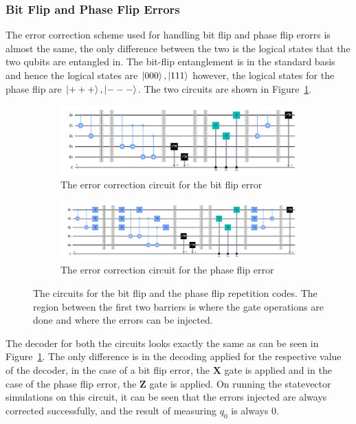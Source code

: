 \documentclass[11pt]{article}
\begin{document}
\subsubsection{Bit Flip and Phase Flip Errors}
The error correction scheme used for handling bit flip and phase flip erorrs is almost the same, the only difference between the two is the logical states that the two qubits are entangled in. The bit-flip entanglement is in the standard basis and hence the logical states are $\ket{000}, \ket{111}$ however, the logical states for the phase flip are $\ket{+++}, \ket{---}$. The two circuits are shown in Figure~\ref{fig:3}.
\begin{figure}[h!]
    \begin{subfigure}{\linewidth}
        \includegraphics[width=\linewidth]{outputs/bit_3.png}
        \caption{The error correction circuit for the bit flip error}
    \end{subfigure}
    \begin{subfigure}{\linewidth}
        \includegraphics[width=\linewidth]{outputs/phase_3.png}
        \caption{The error correction circuit for the phase flip error}
    \end{subfigure}
    \caption{The circuits for the bit flip and the phase flip repetition codes. The region between the first two barriers is where the gate operations are done and where the errors can be injected.}\label{fig:3}
\end{figure}

The decoder for both the circuits looks exactly the same as can be seen in Figure~\ref{fig:3}. The only difference is in the decoding applied for the respective value of the decoder, in the case of a bit flip error, the $\mathbf{X}$ gate is applied and in the case of the phase flip error, the $\mathbf{Z}$ gate is applied. On running the statevector simulations on this circuit, it can be seen that the errors injected are always corrected successfully, and the result of measuring $q_0$ is always $0$.
\end{document}
